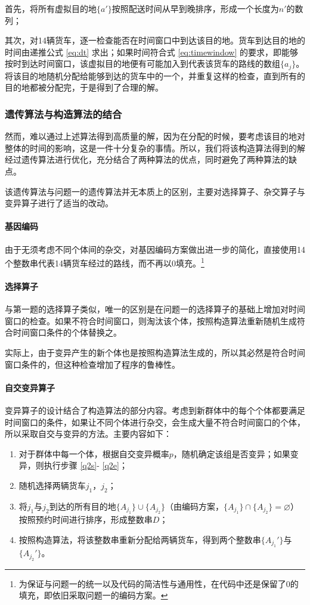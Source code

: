 \documentclass[UTF8,cs4size]{ctexart}
\begin{document}
首先，将所有虚拟目的地$\{a'\}$按照配送时间从早到晚排序，形成一个长度为$n'$的数列；

其次，对14辆货车，逐一检查能否在时间窗口中到达该目的地。货车到达目的地的时间由递推公式 \ref{eq:dt} 求出；如果时间符合式 \ref{eq:timewindow} 的要求，即能够按时到达时间窗口，该虚拟目的地便有可能加入到代表该货车的路线的数组$\{a_j\}$。将该目的地随机分配给能够到达的货车中的一个，并重复这样的检查，直到所有的目的地都被分配完，于是得到了合理的解。
\subsubsection{遗传算法与构造算法的结合}
然而，难以通过上述算法得到高质量的解，因为在分配的时候，要考虑该目的地对整体的时间的影响，这是一件十分复杂的事情。所以，我们将该构造算法得到的解经过遗传算法进行优化，充分结合了两种算法的优点，同时避免了两种算法的缺点。

该遗传算法与问题一的遗传算法并无本质上的区别，主要对选择算子、杂交算子与变异算子进行了适当的改动。
\paragraph{基因编码}
由于无须考虑不同个体间的杂交，对基因编码方案做出进一步的简化，直接使用14个整数串代表14辆货车经过的路线，而不再以0填充。\footnote{为保证与问题一的统一以及代码的简洁性与通用性，在代码中还是保留了0的填充，即依旧采取问题一的编码方案。}
\paragraph{选择算子}
与第一题的选择算子类似，唯一的区别是在问题一的选择算子的基础上增加对时间窗口的检查。如果不符合时间窗口，则淘汰该个体，按照构造算法重新随机生成符合时间窗口条件的个体替换之。

实际上，由于变异产生的新个体也是按照构造算法生成的，所以其必然是符合时间窗口条件的，但这种检查增加了程序的鲁棒性。
\paragraph{自交变异算子}
变异算子的设计结合了构造算法的部分内容。考虑到新群体中的每个个体都要满足时间窗口的条件，如果让不同个体进行杂交，会生成大量不符合时间窗口的个体，所以采取自交与变异的方法。主要内容如下：
\begin{enumerate}
\item 对于群体中每一个体，根据自交变异概率$p$，随机确定该组是否变异；如果变异，则执行步骤 \ref{q2s}- \ref{q2e}；
\item 随机选择两辆货车$j_1$，$j_2$；\label{q2s}
\item 将$j_1$与$j_2$到达的所有目的地$\{A_{j_1}\}\cup\{A_{j_2}\}$（由编码方案，$\{A_{j_1}\}\cap\{A_{j_2}\}= \varnothing $）按照预约时间进行排序，形成整数串$D$；
\item 按照构造算法，将该整数串重新分配给两辆货车，得到两个整数串$\{A_{j_1}'\}$与$\{A_{j_2}'\}$。\label{q2e}
\end{enumerate}
\end{document}
